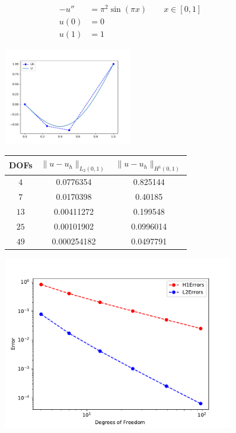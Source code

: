 \documentclass{uonmathreport}
\theoremstyle{definition}
\theoremstyle{problem}
\theoremstyle{theorem}
\begin{document}
\begin{subequations} 
\label{eq:Steady Diffusion2} 
\begin{align}
-u'' &= \pi^2 \sin( \pi x)		\quad \quad  x \in [0, 1] \\  	
u(0) &= 0 \\
u(1) &= 1
\end{align}
\end{subequations}


\begin{figure}[h]
   \includegraphics[width=0.5\textwidth]{EllipticPDE1_hi.pdf}
 \label{fig:eliptic1}
\end{figure}


\begin{figure}[h!]
\begin{minipage}{0.48\hsize}
\begin{tabular}{ccc}
    \hline
     DOFs & $\|u-u_h\|_{L_2(0,1)}$  & $\|u-u_h\|_{H^1(0,1)}$   \\ \hline
     $4$ & 0.0776354  & 0.825144   \\
     $7$ & 0.0170398  & 0.40185   \\
     $13$ & 0.00411272  & 0.199548   \\
	 $25$ & 0.00101902  & 0.0996014 \\
    $49$ & 0.000254182  & 0.0497791   \\
    \hline
  \end{tabular}
  \end{minipage}
  \hfill
    \begin{minipage}{0.48\hsize}
  \includegraphics[width=0.9\textwidth]{EllipticPDE1Convergences.pdf}
\end{minipage}
    \end{figure}
    
\end{document}
